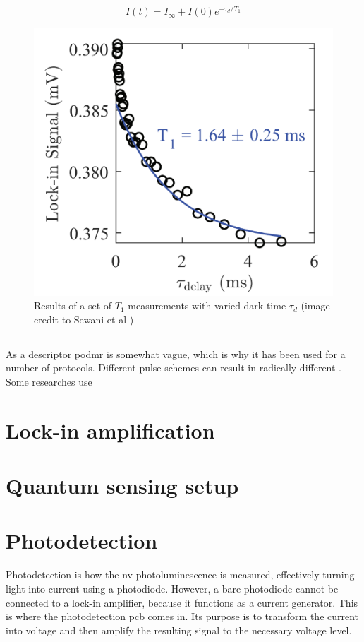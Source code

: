 \begin{equation}\label{eq:t1}
I(t)=I_\infty+I(0)e^{-\tau_d/T_1}
\end{equation}



\begin{figure}[ht]
	\centering
	\includegraphics[width=0.7\linewidth]{img/t1_result}
	\caption{Results of a set of $T_1$ measurements with varied dark time $\tau_d$ (image credit to Sewani et al \cite{sewani2020coherent})}
	\label{fig:t1result}
\end{figure}



\subsection{}
As a descriptor \gls{podmr} is somewhat vague, which is why it has been used for a number of protocols. Different pulse schemes can result in radically different . Some researches use 

\section{Lock-in amplification} \label{chap:lockin}
\section{Quantum sensing setup}
\section{Photodetection }
Photodetection is how the \gls{nv} photoluminescence is measured, effectively turning light into current using a photodiode. However, a bare photodiode cannot be connected to a lock-in amplifier, because it functions as a current generator. This is where the photodetection \gls {pcb} comes in. Its purpose is to transform the current into voltage and then amplify the resulting signal to the necessary voltage level. 

